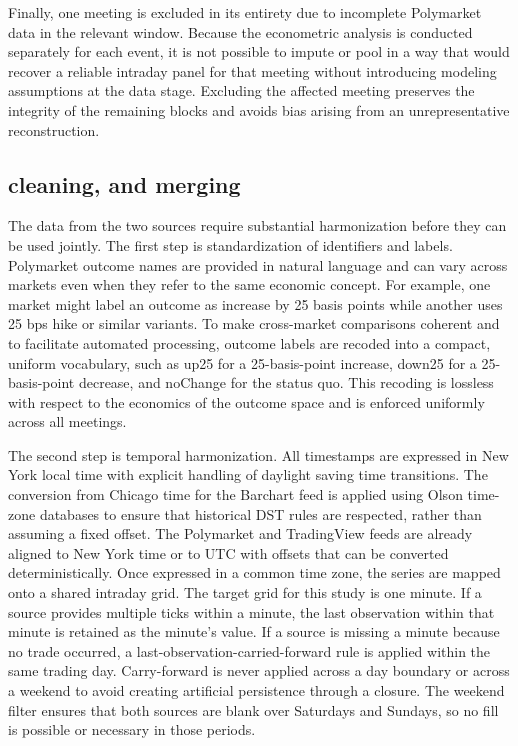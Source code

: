Finally, one meeting is excluded in its entirety due to incomplete Polymarket data in the relevant window. Because the econometric analysis is conducted separately for each event, it is not possible to impute or pool in a way that would recover a reliable intraday panel for that meeting without introducing modeling assumptions at the data stage. Excluding the affected meeting preserves the integrity of the remaining blocks and avoids bias arising from an unrepresentative reconstruction.

\subsection{cleaning, and merging}

The data from the two sources require substantial harmonization before they can be used jointly. The first step is standardization of identifiers and labels. Polymarket outcome names are provided in natural language and can vary across markets even when they refer to the same economic concept. For example, one market might label an outcome as increase by 25 basis points while another uses 25 bps hike or similar variants. To make cross-market comparisons coherent and to facilitate automated processing, outcome labels are recoded into a compact, uniform vocabulary, such as up25 for a 25-basis-point increase, down25 for a 25-basis-point decrease, and noChange for the status quo. This recoding is lossless with respect to the economics of the outcome space and is enforced uniformly across all meetings.

The second step is temporal harmonization. All timestamps are expressed in New York local time with explicit handling of daylight saving time transitions. The conversion from Chicago time for the Barchart feed is applied using Olson time-zone databases to ensure that historical DST rules are respected, rather than assuming a fixed offset. The Polymarket and TradingView feeds are already aligned to New York time or to UTC with offsets that can be converted deterministically. Once expressed in a common time zone, the series are mapped onto a shared intraday grid. The target grid for this study is one minute. If a source provides multiple ticks within a minute, the last observation within that minute is retained as the minute’s value. If a source is missing a minute because no trade occurred, a last-observation-carried-forward rule is applied within the same trading day. Carry-forward is never applied across a day boundary or across a weekend to avoid creating artificial persistence through a closure. The weekend filter ensures that both sources are blank over Saturdays and Sundays, so no fill is possible or necessary in those periods.

